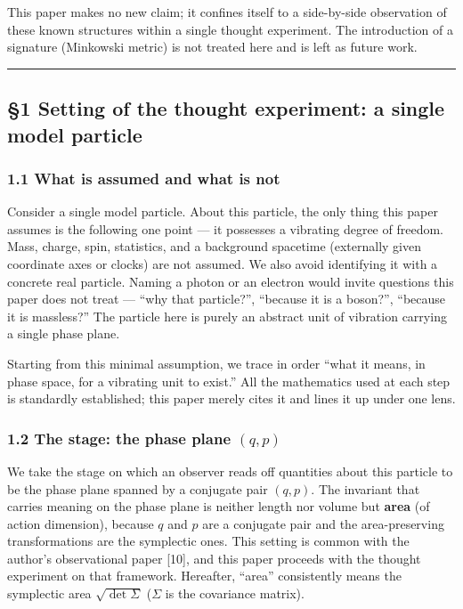 \documentclass[
]{article}
\begin{document}
This paper makes no new claim; it confines itself to a side-by-side
observation of these known structures within a single thought
experiment. The introduction of a signature (Minkowski metric) is not
treated here and is left as future work.

\begin{center}\rule{0.5\linewidth}{0.5pt}\end{center}

\subsection{§1 Setting of the thought experiment: a single model
particle}\label{setting-of-the-thought-experiment-a-single-model-particle}

\subsubsection{1.1 What is assumed and what is
not}\label{what-is-assumed-and-what-is-not}

Consider a single model particle. About this particle, the only thing
this paper assumes is the following one point --- it possesses a
vibrating degree of freedom. Mass, charge, spin, statistics, and a
background spacetime (externally given coordinate axes or clocks) are
not assumed. We also avoid identifying it with a concrete real particle.
Naming a photon or an electron would invite questions this paper does
not treat --- ``why that particle?'', ``because it is a boson?'',
``because it is massless?'' The particle here is purely an abstract unit
of vibration carrying a single phase plane.

Starting from this minimal assumption, we trace in order ``what it
means, in phase space, for a vibrating unit to exist.'' All the
mathematics used at each step is standardly established; this paper
merely cites it and lines it up under one lens.

\subsubsection{\texorpdfstring{1.2 The stage: the phase plane
\((q,p)\)}{1.2 The stage: the phase plane (q,p)}}\label{the-stage-the-phase-plane-qp}

We take the stage on which an observer reads off quantities about this
particle to be the phase plane spanned by a conjugate pair \((q,p)\).
The invariant that carries meaning on the phase plane is neither length
nor volume but \textbf{area} (of action dimension), because \(q\) and
\(p\) are a conjugate pair and the area-preserving transformations are
the symplectic ones. This setting is common with the author's
observational paper {[}10{]}, and this paper proceeds with the thought
experiment on that framework. Hereafter, ``area'' consistently means the
symplectic area \(\sqrt{\det\Sigma}\) (\(\Sigma\) is the covariance
matrix).
\end{document}
